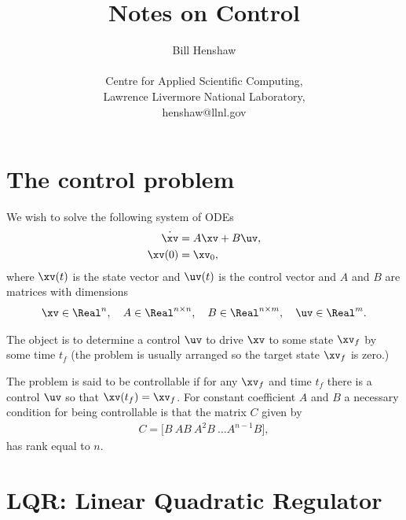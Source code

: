 \documentclass[11pt]{article}
\begin{document}
 
\title{Notes on Control}

\author{
Bill Henshaw \\
\  \\
Centre for Applied Scientific Computing, \\
Lawrence Livermore National Laboratory, \\
henshaw@llnl.gov }
 
\maketitle

\tableofcontents

\clearpage 
\section{The control problem}

We wish to solve the following system of ODEs
\begin{align}
    \dot{\xv} &= A \xv + B \uv ,   \label{eq:stateEquation} \\
  \xv(0) &= \xv_0, 
\end{align}
where $\xv(t)$ is the state vector and $\uv(t)$ is the control vector and $A$ and $B$ are matrices with dimensions
\begin{align}
     \xv \in \Real^n, \quad A \in \Real^{n\times n}, \quad B \in \Real^{n\times m}, \quad \uv \in \Real^m .
\end{align}

The object is to determine a control $\uv$ to drive $\xv$ to some state $\xv_f$ by some time $t_f$ (the problem is usually arranged
so the target state $\xv_f$ is zero.)

The problem is said to be controllable if for any $\xv_f$ and time $t_f$ there is a control $\uv$ so that
$\xv(t_f)=\xv_f$. For constant coefficient $A$ and $B$ a necessary condition for being controllable is that 
the matrix $C$ given by 
\begin{align}
   C = \Big[ B ~ A B ~ A^2 B ~ \ldots A^{n-1} B] ,
\end{align}
has rank equal to $n$.

\section{LQR: Linear Quadratic Regulator}
\end{document}
